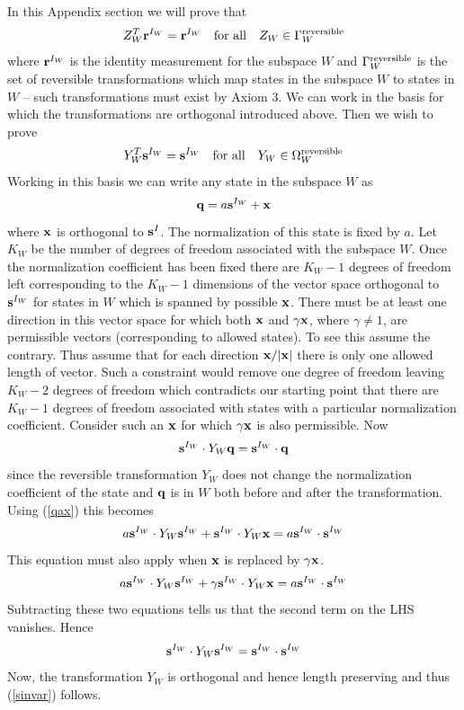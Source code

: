 \documentclass[12pt]{article}
\begin{document}
In this Appendix section we will prove that
\begin{equation}
Z_W^T{\bf r}^{I_W}={\bf r}^{I_W} ~~~{\rm for~all} ~~~Z_W\in\Gamma_W^{\rm
reversible}
\end{equation}
where ${\bf r}^{I_W}$ is the identity measurement for the subspace $W$
and $\Gamma_W^{\rm reversible}$ is the set of reversible
transformations which map states in the subspace $W$ to states in $W$ --
such transformations must exist by Axiom 3.
We can work in the basis for which the transformations are orthogonal
introduced above.  Then we wish to prove
\begin{equation}\label{sinvar}
Y^T_W{\bf s}^{I_W}={\bf s}^{I_W} ~~~{\rm for~all}~~~Y_W\in\Omega_W^{\rm
reversible}
\end{equation}
Working in this basis we can write any state in the subspace $W$ as
\begin{equation}\label{qax}
{\bf q}= a {\bf s}^{I_W} + {\bf x}
\end{equation}
where ${\bf x}$ is orthogonal to ${\bf s}^I$.
The normalization of this state is fixed by $a$. Let $K_W$ be the number
of degrees of freedom associated with the subspace $W$.
 Once the normalization
coefficient has been fixed there are $K_W-1$ degrees of freedom left
corresponding to the $K_W-1$ dimensions of the vector space orthogonal to
${\bf s}^{I_W}$  for states in $W$ which is spanned by possible ${\bf
x}$.  There must be
at least one direction in this vector space for which both ${\bf x}$
and $\gamma{\bf x}$, where $\gamma\not=1$,
are permissible vectors (corresponding to allowed states).  To see this
assume the contrary. Thus assume that for each direction ${\bf x}/|{\bf
x}|$ there is only one allowed length of vector. Such a constraint would
remove one degree of freedom leaving $K_W-2$ degrees of freedom which
contradicts our starting point that there are
$K_W-1$ degrees of freedom
associated with states with a particular normalization coefficient.
Consider such an ${\bf x}$ for which $\gamma{\bf x}$ is also
permissible. Now
\begin{equation}
{\bf s}^{I_W}\cdot Y_W {\bf q}={\bf s}^{I_W}\cdot{\bf q}
\end{equation}
since the reversible transformation $Y_W$ does not change the
normalization coefficient of the state and ${\bf q}$ is in $W$ both
before and after the transformation. Using (\ref{qax}) this becomes
\begin{equation}
a{\bf s}^{I_W}\cdot Y_W {\bf s}^{I_W} + {\bf s}^{I_W}\cdot Y_W {\bf x}
 =a{\bf s}^{I_W}\cdot{\bf s}^{I_W}
\end{equation}
This equation must also apply when ${\bf x}$ is replaced by $\gamma{\bf
x}$.
\begin{equation}
a{\bf s}^{I_W}\cdot Y_W {\bf s}^{I_W} + \gamma{\bf s}^{I_W}\cdot Y_W {\bf x}
 =a{\bf s}^{I_W}\cdot{\bf s}^{I_W}
\end{equation}
Subtracting these two equations tells us that the second term on the LHS
vanishes. Hence
\begin{equation}
{\bf s}^{I_W}\cdot Y_W {\bf s}^{I_W}
 ={\bf s}^{I_W}\cdot{\bf s}^{I_W}
\end{equation}
Now, the transformation $Y_W$ is orthogonal and hence length preserving
and thus (\ref{sinvar}) follows.
\end{document}
